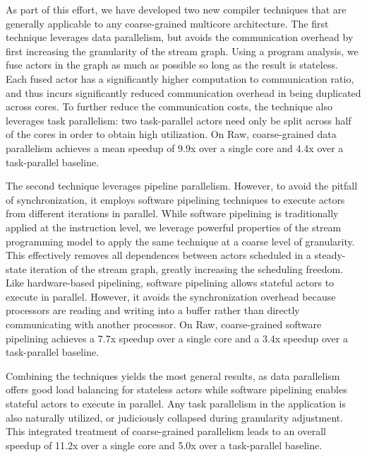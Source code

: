 As part of this effort, we have developed two new compiler techniques
that are generally applicable to any coarse-grained multicore
architecture.  The first technique leverages data parallelism, but
avoids the communication overhead by first increasing the granularity
of the stream graph.  Using a program analysis, we fuse actors in the
graph as much as possible so long as the result is stateless.  Each
fused actor has a significantly higher computation to communication
ratio, and thus incurs significantly reduced communication overhead in
being duplicated across cores.  To further reduce the communication
costs, the technique also leverages task parallelism: two
task-parallel actors need only be split across half of the cores in
order to obtain high utilization.  On Raw, coarse-grained data
parallelism achieves a mean speedup of 9.9x over a single core and
4.4x over a task-parallel baseline.

The second technique leverages pipeline parallelism.  However, to
avoid the pitfall of synchronization, it employs software pipelining
techniques to execute actors from different iterations in parallel.
While software pipelining is traditionally applied at the instruction
level, we leverage powerful properties of the stream programming model
to apply the same technique at a coarse level of granularity.  This
effectively removes all dependences between actors scheduled in a
steady-state iteration of the stream graph, greatly increasing the
scheduling freedom.  Like hardware-based pipelining, software
pipelining allows stateful actors to execute in parallel.
However, it avoids the synchronization overhead because processors are
reading and writing into a buffer rather than directly communicating
with another processor.  On Raw, coarse-grained software pipelining
achieves a 7.7x speedup over a single core and a 3.4x speedup over a
task-parallel baseline.

Combining the techniques yields the most general results, as data
parallelism offers good load balancing for stateless actors while
software pipelining enables stateful actors to execute in parallel.
Any task parallelism in the application is also naturally utilized, or
judiciously collapsed during granularity adjustment.  This integrated
treatment of coarse-grained parallelism leads to an overall speedup of
11.2x over a single core and 5.0x over a task-parallel baseline.

